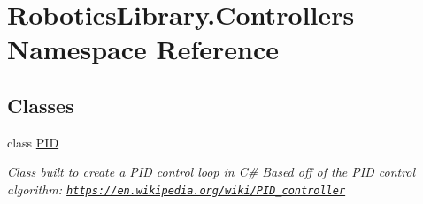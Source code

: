 \hypertarget{namespace_robotics_library_1_1_controllers}{}\section{Robotics\+Library.\+Controllers Namespace Reference}
\label{namespace_robotics_library_1_1_controllers}
\subsection*{Classes}
\begin{DoxyCompactItemize}
\item 
class \hyperlink{class_robotics_library_1_1_controllers_1_1_p_i_d}{P\+ID}
\begin{DoxyCompactList}\small\item\em Class built to create a \hyperlink{class_robotics_library_1_1_controllers_1_1_p_i_d}{P\+ID} control loop in C\# Based off of the \hyperlink{class_robotics_library_1_1_controllers_1_1_p_i_d}{P\+ID} control algorithm\+: \href{https://en.wikipedia.org/wiki/PID_controller}{\tt https\+://en.\+wikipedia.\+org/wiki/\+P\+I\+D\+\_\+controller} \end{DoxyCompactList}\end{DoxyCompactItemize}
